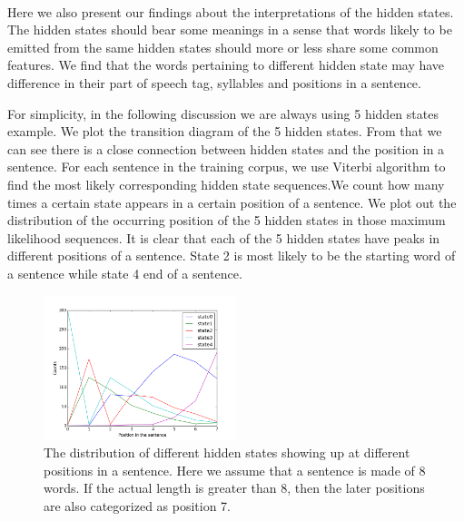 \paragraph{} Here we also present our findings about the interpretations of the hidden states.
The hidden states should bear some meanings in a sense that words likely to be emitted from the same hidden states should more or less share some common features. We find that the words pertaining to different hidden state may have difference in their part of speech tag, syllables and positions in a sentence.

For simplicity, in the following discussion we are always using 5 hidden states example.  We plot the transition diagram of the 5 hidden states. From that we can see there is a close connection between hidden states and the position in a sentence.
For each sentence in the training corpus, we use Viterbi algorithm to find the most likely corresponding hidden state sequences.We count how many times a certain state appears in a certain position of a sentence.  We plot out the distribution of the occurring position of the 5 hidden states in those maximum likelihood sequences. 
It is clear that each of the 5 hidden states have peaks in different positions of a sentence. State 2 is most likely to be the starting word of a sentence while state 4 end of a sentence.
 \begin{figure}
 \includegraphics[width=0.5\textwidth]{./figure/hiddenstates_position_in_the_sentence.png}
 \caption{The distribution of different hidden states showing up at different positions in a sentence. Here we assume that a sentence is made of 8 words. If the actual length is greater than 8, then the later positions are also categorized as position 7.\label{fig:position}}
\end{figure}

